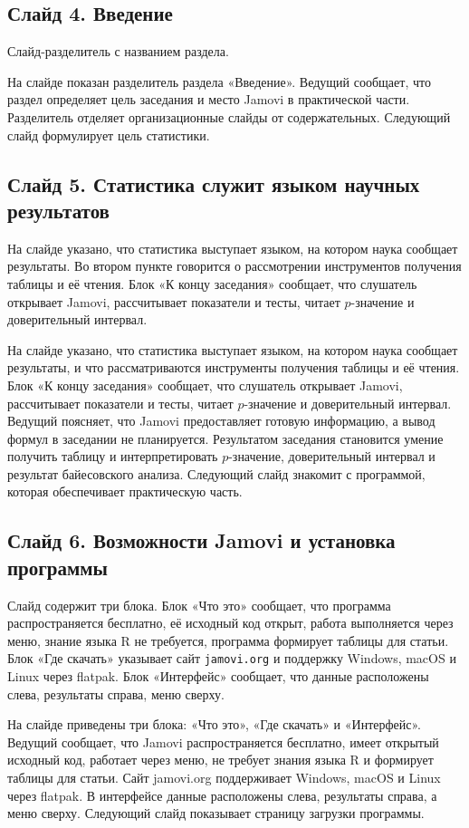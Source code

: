 \documentclass[11pt,a4paper]{article}
\begin{document}
\subsection*{Слайд 4. Введение}
\begin{onslide}
Слайд-разделитель с названием раздела.
\end{onslide}
На слайде показан разделитель раздела «Введение». Ведущий сообщает, что раздел определяет цель заседания и место Jamovi в практической части. Разделитель отделяет организационные слайды от содержательных. Следующий слайд формулирует цель статистики.

\subsection*{Слайд 5. Статистика служит языком научных результатов}
\begin{onslide}
На слайде указано, что статистика выступает языком, на котором наука сообщает результаты. Во втором пункте говорится о рассмотрении инструментов получения таблицы и её чтения. Блок «К концу заседания» сообщает, что слушатель открывает Jamovi, рассчитывает показатели и тесты, читает $p$-значение и доверительный интервал.
\end{onslide}
На слайде указано, что статистика выступает языком, на котором наука сообщает результаты, и что рассматриваются инструменты получения таблицы и её чтения. Блок «К концу заседания» сообщает, что слушатель открывает Jamovi, рассчитывает показатели и тесты, читает $p$-значение и доверительный интервал. Ведущий поясняет, что Jamovi предоставляет готовую информацию, а вывод формул в заседании не планируется. Результатом заседания становится умение получить таблицу и интерпретировать $p$-значение, доверительный интервал и результат байесовского анализа. Следующий слайд знакомит с программой, которая обеспечивает практическую часть.

\subsection*{Слайд 6. Возможности Jamovi и установка программы}
\begin{onslide}
Слайд содержит три блока. Блок «Что это» сообщает, что программа распространяется бесплатно, её исходный код открыт, работа выполняется через меню, знание языка R не требуется, программа формирует таблицы для статьи. Блок «Где скачать» указывает сайт \texttt{jamovi.org} и поддержку Windows, macOS и Linux через flatpak. Блок «Интерфейс» сообщает, что данные расположены слева, результаты справа, меню сверху.
\end{onslide}
На слайде приведены три блока: «Что это», «Где скачать» и «Интерфейс». Ведущий сообщает, что Jamovi распространяется бесплатно, имеет открытый исходный код, работает через меню, не требует знания языка R и формирует таблицы для статьи. Сайт jamovi.org поддерживает Windows, macOS и Linux через flatpak. В интерфейсе данные расположены слева, результаты справа, а меню сверху. Следующий слайд показывает страницу загрузки программы.
\end{document}
